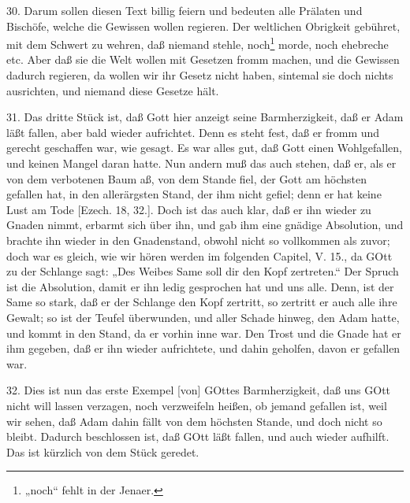 30. Darum sollen diesen Text billig feiern und bedeuten alle Prälaten und Bischöfe, welche die Gewissen wollen regieren. Der weltlichen Obrigkeit gebühret, mit dem Schwert zu wehren, daß niemand stehle, noch\footnote{„noch“ fehlt in der Jenaer.} morde, noch ehebreche etc. Aber daß sie die Welt wollen mit Gesetzen fromm machen, und die Gewissen dadurch regieren, da wollen wir ihr Gesetz nicht haben, sintemal sie doch nichts ausrichten, und niemand diese Gesetze hält.

31. Das dritte Stück ist, daß Gott hier anzeigt seine Barmherzigkeit, daß er Adam läßt fallen, aber bald wieder aufrichtet. Denn es steht fest, daß er fromm und gerecht geschaffen war, wie gesagt. Es war alles gut, daß Gott einen Wohlgefallen, und keinen Mangel daran hatte. Nun andern muß das auch stehen, daß er, als er von dem verbotenen Baum aß, von dem Stande fiel, der Gott am höchsten gefallen hat, in den allerärgsten Stand, der ihm nicht gefiel; denn er hat keine Lust am Tode [Ezech. 18, 32.]. Doch ist das auch klar, daß er ihn wieder zu Gnaden nimmt, erbarmt sich über ihn, und gab ihm eine gnädige Absolution, und brachte ihn wieder in den Gnadenstand, obwohl nicht so vollkommen als zuvor; doch war es
gleich, wie wir hören werden im folgenden Capitel, V. 15., da GOtt zu der Schlange sagt: „Des Weibes Same soll dir den Kopf zertreten.“ Der Spruch ist die Absolution, damit er ihn ledig gesprochen hat und uns alle. Denn, ist der Same so stark, daß er der Schlange den Kopf zertritt, so zertritt er auch alle ihre Gewalt; so ist der Teufel überwunden, und aller Schade hinweg, den Adam hatte, und kommt in den Stand, da er vorhin inne war. Den Trost und die Gnade hat er ihm gegeben, daß er ihn wieder aufrichtete, und dahin geholfen, davon er gefallen war.

32. Dies ist nun das erste Exempel [von] GOttes Barmherzigkeit, daß uns GOtt nicht will lassen verzagen, noch verzweifeln heißen, ob jemand gefallen ist, weil wir sehen, daß Adam dahin fällt von dem höchsten Stande, und doch nicht so bleibt. Dadurch beschlossen ist, daß GOtt läßt fallen, und auch wieder aufhilft. Das ist kürzlich von dem Stück geredet.

